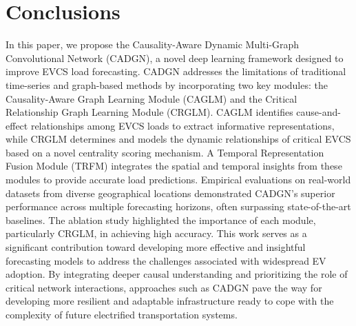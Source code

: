 \documentclass[lettersize,journal]{IEEEtran}
\newcommand{\hl}[1]{\textcolor{blue}{#1}}
\begin{document}

\vspace{-5pt}
\section{Conclusions}
\label{section:conclusion}

In this paper, we propose the Causality-Aware Dynamic Multi-Graph Convolutional Network (CADGN), a novel deep learning framework designed to improve EVCS load forecasting. CADGN addresses the limitations of traditional time-series and graph-based methods by incorporating two key modules: the Causality-Aware Graph Learning Module (CAGLM) and the Critical Relationship Graph Learning Module (CRGLM). CAGLM identifies cause-and-effect relationships among EVCS loads to extract informative representations, while CRGLM determines and models the dynamic relationships of critical EVCS based on a novel centrality scoring mechanism. A Temporal Representation Fusion Module (TRFM) integrates the spatial and temporal insights from these modules to provide accurate load predictions. Empirical evaluations on real-world datasets from diverse geographical locations demonstrated CADGN's superior performance across multiple forecasting horizons, often surpassing state-of-the-art baselines. The ablation study highlighted the importance of each module, particularly CRGLM, in achieving high accuracy. This work serves as a significant contribution toward developing more effective and insightful forecasting models to address the challenges associated with widespread EV adoption. By integrating deeper causal understanding and prioritizing the role of critical network interactions, approaches such as CADGN pave the way for developing more resilient and adaptable infrastructure ready to cope with the complexity of future electrified transportation systems.
\end{document}
